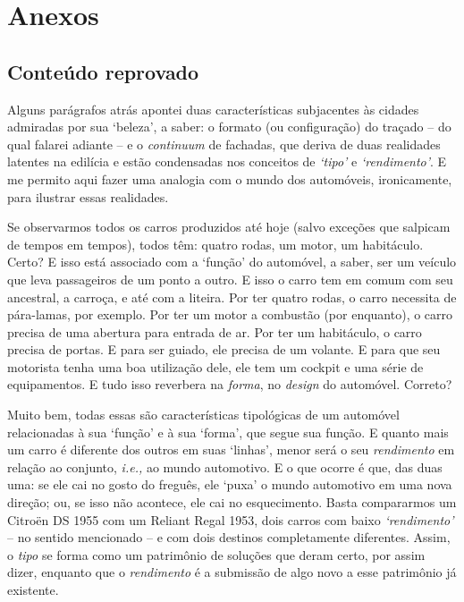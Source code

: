 \documentclass[12pt, a4paper]{book} %
\begin{document}
        \chapter*{Anexos}

        \section{Conteúdo reprovado}%
            Alguns parágrafos atrás apontei duas características subjacentes às cidades admiradas por sua `beleza', a saber: o formato (ou configuração) do traçado – do qual falarei adiante – e o \textit{continuum} de fachadas, que deriva de duas realidades latentes na edilícia e estão condensadas nos conceitos de \emph{`tipo'} e \emph{`rendimento'}. E me permito aqui fazer uma analogia com o mundo dos automóveis, ironicamente, para ilustrar essas realidades.

            Se observarmos todos os carros produzidos até hoje (salvo exceções que salpicam de tempos em tempos), todos têm: quatro rodas, um motor, um habitáculo. Certo? E isso está associado com a `função' do automóvel, a saber, ser um veículo que leva passageiros de um ponto a outro. E isso o carro tem em comum com seu ancestral, a carroça, e até com a liteira. Por ter quatro rodas, o carro necessita de pára-lamas, por exemplo. Por ter um motor a combustão (por enquanto), o carro precisa de uma abertura para entrada de ar. Por ter um habitáculo, o carro precisa de portas. E para ser guiado, ele precisa de um volante. E para que seu motorista tenha uma boa utilização dele, ele tem um cockpit e uma série de equipamentos. E tudo isso reverbera na \textit{forma}, no \textit{design} do automóvel. Correto? 

            Muito bem, todas essas são características tipológicas de um automóvel relacionadas à sua `função' e à sua `forma', que segue sua função. E quanto mais um carro é diferente dos outros em suas `linhas', menor será o seu \textit{rendimento} em relação ao conjunto, \textit{i.e.,} ao mundo automotivo. E o que ocorre é que, das duas uma: se ele cai no gosto do freguês, ele `puxa' o mundo automotivo em uma nova direção; ou, se isso não acontece, ele cai no esquecimento. Basta compararmos um Citroën DS 1955 com um Reliant Regal 1953, dois carros com baixo \textit{`rendimento'} – no sentido mencionado – e com dois destinos completamente diferentes. Assim, o \textit{tipo} se forma como um patrimônio de soluções que deram certo, por assim dizer, enquanto que o \textit{rendimento} é a submissão de algo novo a esse patrimônio já existente.
	
\end{document}
